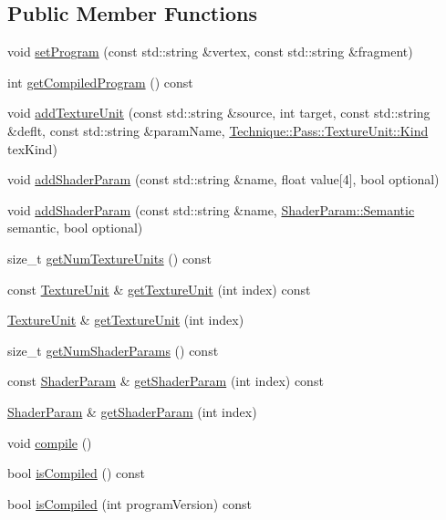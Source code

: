 \subsection*{Public Member Functions}
\begin{DoxyCompactItemize}
\item 
void \hyperlink{classTechnique_1_1Pass_a00e6a6d35ac9335eb0f02598244a0719}{set\+Program} (const std\+::string \&vertex, const std\+::string \&fragment)
\item 
int \hyperlink{classTechnique_1_1Pass_a860c154ace27066c758e9ca9346936d9}{get\+Compiled\+Program} () const 
\item 
void \hyperlink{classTechnique_1_1Pass_aead9ee6bb342653cc6cdea899f90afc2}{add\+Texture\+Unit} (const std\+::string \&source, int target, const std\+::string \&deflt, const std\+::string \&param\+Name, \hyperlink{structTechnique_1_1Pass_1_1TextureUnit_adabb8281e0f47034e7c36d732dd8adc3}{Technique\+::\+Pass\+::\+Texture\+Unit\+::\+Kind} tex\+Kind)
\item 
void \hyperlink{classTechnique_1_1Pass_a2e4de930784ff92e2ec66ef6b3abf0ae}{add\+Shader\+Param} (const std\+::string \&name, float value\mbox{[}4\mbox{]}, bool optional)
\item 
void \hyperlink{classTechnique_1_1Pass_ae8c18f8a78a15ef6662509e45f30599b}{add\+Shader\+Param} (const std\+::string \&name, \hyperlink{structTechnique_1_1Pass_1_1ShaderParam_adfc05401be5223ca462814070a09c776}{Shader\+Param\+::\+Semantic} semantic, bool optional)
\item 
size\+\_\+t \hyperlink{classTechnique_1_1Pass_acc2db24fba86ab8f5fe3f9ddc7037b79}{get\+Num\+Texture\+Units} () const 
\item 
const \hyperlink{structTechnique_1_1Pass_1_1TextureUnit}{Texture\+Unit} \& \hyperlink{classTechnique_1_1Pass_a87a19c344d76a5eaae85d940b784f2d2}{get\+Texture\+Unit} (int index) const 
\item 
\hyperlink{structTechnique_1_1Pass_1_1TextureUnit}{Texture\+Unit} \& \hyperlink{classTechnique_1_1Pass_af72268df028e0c029fac7c956329e334}{get\+Texture\+Unit} (int index)
\item 
size\+\_\+t \hyperlink{classTechnique_1_1Pass_a7be8c00e393ea93239b056796ea1cd56}{get\+Num\+Shader\+Params} () const 
\item 
const \hyperlink{structTechnique_1_1Pass_1_1ShaderParam}{Shader\+Param} \& \hyperlink{classTechnique_1_1Pass_a2915dcb141fb598be0753470d9f3161a}{get\+Shader\+Param} (int index) const 
\item 
\hyperlink{structTechnique_1_1Pass_1_1ShaderParam}{Shader\+Param} \& \hyperlink{classTechnique_1_1Pass_aeecc48e84e7eb74a3fd8db142e6e391e}{get\+Shader\+Param} (int index)
\item 
void \hyperlink{classTechnique_1_1Pass_ae014e148f1cacf945b1bae93cdfd6bf8}{compile} ()
\item 
bool \hyperlink{classTechnique_1_1Pass_a26f6a3f57d8f3f7388c86ba55680a022}{is\+Compiled} () const 
\item 
bool \hyperlink{classTechnique_1_1Pass_ac708c90c765a77106858be94e8d665a5}{is\+Compiled} (int program\+Version) const 
\end{DoxyCompactItemize}

